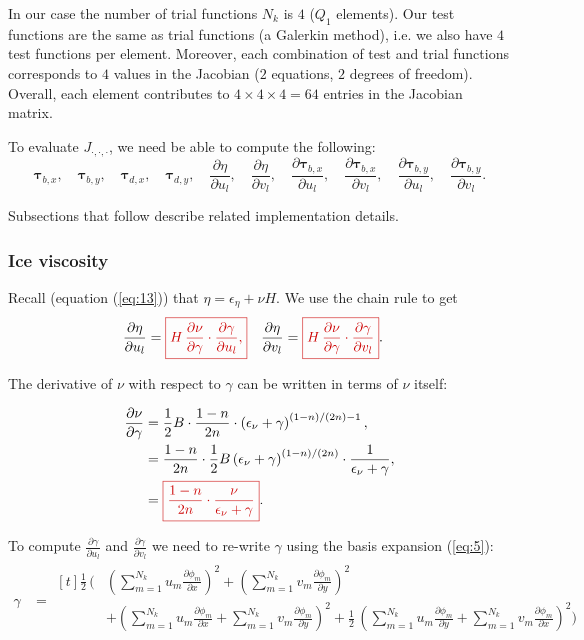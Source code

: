\documentclass{amsart}
\newcommand{\diff}[2]{\ensuremath{\frac{\partial #1}{\partial #2}}}
\newcommand{\diffbasisexpansion}[3]{\ensuremath{\sum_{#3 = 1}^{N_k} {#1}_{#3} \diff{\phi_{#3}}{#2} }}
\newcommand{\UX}{\diffbasisexpansion{u}{x}{m}}
\newcommand{\UY}{\diffbasisexpansion{u}{y}{m}}
\newcommand{\VX}{\diffbasisexpansion{v}{x}{m}}
\newcommand{\VY}{\diffbasisexpansion{v}{y}{m}}
\newcommand{\basalshearstress}[1]{\boldsymbol{\tau}_{b#1}}
\newcommand{\taubx}{\basalshearstress{,x}}
\newcommand{\tauby}{\basalshearstress{,y}}
\newcommand{\drivingstress}[1]{\boldsymbol{\tau}_{d#1}}
\newcommand{\taudx}{\drivingstress{,x}}
\newcommand{\taudy}{\drivingstress{,y}}
\newcommand{\highlight}[1]{{\color{red!80!black} \fbox{$ \displaystyle #1 $} }}
\begin{document}
In our case the number of trial functions $N_k$ is $4$ ($Q_1$ elements). Our test functions are the same as trial functions (a Galerkin method), i.e. we also have $4$ test functions per element. Moreover, each combination of test and trial functions corresponds to $4$ values in the Jacobian ($2$ equations, $2$ degrees of freedom). Overall, each element contributes to $4 \times 4 \times 4 = 64$ entries in the Jacobian matrix.

To evaluate $J_{\cdot,\cdot,\cdot}$, we need be able to compute the following:
\begin{equation*}
    \taubx, \quad \tauby, \quad \taudx, \quad \taudy, \quad \diff{\eta}{u_l}, \quad \diff{\eta}{v_l}, \quad
    \diff{\taubx}{u_l}, \quad \diff{\taubx}{v_l}, \quad \diff{\tauby}{u_l}, \quad \diff{\tauby}{v_l}.
\end{equation*}

Subsections that follow describe related implementation details.


\subsubsection{Ice viscosity}
\label{sec:viscosity-evaluation}

Recall (equation (\ref{eq:13})) that $\eta = \epsilon_{\eta} + \nu H$. We use the chain rule to get
\begin{align*}
  \diff{\eta}{u_l} &= \highlight{ H\,\diff{\nu}{\gamma}\cdot \diff{\gamma}{u_l}, } &   \diff{\eta}{v_l} &= \highlight{ H\,\diff{\nu}{\gamma}\cdot \diff{\gamma}{v_l} }.
\end{align*}

The derivative of $\nu$ with respect to $\gamma$ can be written in terms of $\nu$ itself:

\begin{align*}
  \diff{\nu}{\gamma} & = \frac{1}{2} B \cdot \frac{1 - n}{2n} \cdot \left(\epsilon_{\nu} + \gamma \right)^{(1 - n) / (2n) - 1}, \\
      & = \frac{1 - n}{2n} \cdot \frac{1}{2} B \left( \epsilon_{\nu} + \gamma \right)^{(1 - n) / (2n)} \cdot \frac{1}{\epsilon_{\nu} + \gamma}, \\
      & = \highlight{ \frac{1 - n}{2n} \cdot \frac{\nu}{\epsilon_{\nu} + \gamma} }.
\end{align*}

To compute $\diff{\gamma}{u_l}$ and $\diff{\gamma}{v_l}$ we need to re-write $\gamma$ using the basis expansion (\ref{eq:5}):
\begin{align*}
  \gamma &=
           \begin{aligned}[t]
             \frac{1}{2}\, \Bigg(&\left(\UX\right)^2 + \left(\VY\right)^2 \\
             & + \left(\UX + \VY\right)^2 + \frac{1}{2}\, \left(\UY + \VX\right)^2\Bigg) \\
           \end{aligned}
\end{align*}
\end{document}
